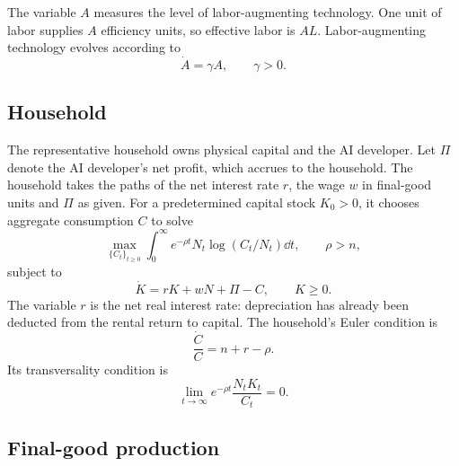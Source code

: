 The variable $A$ measures the level of labor-augmenting technology. One unit of labor supplies $A$ efficiency units, so effective labor is $AL$. Labor-augmenting technology evolves according to
\begin{equation}
 \dot A=\gamma A,
 \qquad \gamma>0.
 \label{eq:rewrite-labor-productivity}
\end{equation}

\subsection{Household}
\label{subsec:rewrite-household}

The representative household owns physical capital and the AI developer. Let \(\Pi\) denote the AI developer's net profit, which accrues to the household. The household takes the paths of the net interest rate \(r\), the wage \(w\) in final-good units and \(\Pi\) as given. For a predetermined capital stock $K_0>0$, it chooses aggregate consumption $C$ to solve
\begin{equation}
 \max_{\{C_t\}_{t\geq0}}
 \int_0^\infty e^{-\rho t}N_t\log(C_t/N_t)\dd t,
 \qquad \rho>n,
 \label{eq:rewrite-household-problem}
\end{equation}
subject to
\begin{equation}
 \dot K=rK+wN+\Pi-C,\qquad K\geq0.
 \label{eq:rewrite-household-budget}
\end{equation}
The variable $r$ is the net real interest rate: depreciation has already been deducted from the rental return to capital. The household's Euler condition is
\begin{equation}
 \frac{\dot C}{C}=n+r-\rho.
 \label{eq:rewrite-euler}
\end{equation}
Its transversality condition is
\begin{equation}
 \lim_{t\to\infty}e^{-\rho t}\frac{N_tK_t}{C_t}=0.
 \label{eq:rewrite-household-tvc}
\end{equation}

\subsection{Final-good production}
\label{subsec:rewrite-final-production}

